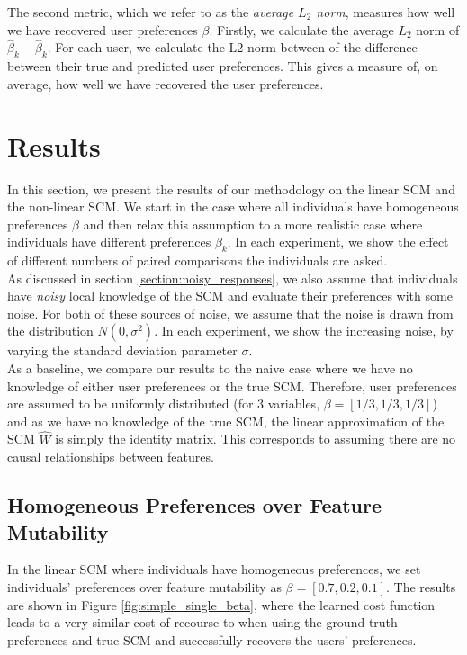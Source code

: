 \bigskip

The second metric, which we refer to as the \textit{average $L_2$ norm}, measures how well we have recovered user preferences $\beta$. Firstly, we calculate the average $L_2$ norm of $\hat{\beta}_k - \hat{\beta}_k$. For each user, we calculate the L2 norm between of the difference between their true and predicted user preferences. This gives a measure of, on average, how well we have recovered the user preferences. \\

\section{Results}

In this section, we present the results of our methodology on the linear SCM and the non-linear SCM. We start in the case where all individuals have homogeneous preferences $\beta$ and then relax this assumption to a more realistic case where individuals have different preferences $\beta_k$. In each experiment, we show the effect of different numbers of paired comparisons the individuals are asked. \\

As discussed in section \ref{section:noisy_responses}, we also assume that individuals have \textit{noisy} local knowledge of the SCM and evaluate their preferences with some noise. For both of these sources of noise, we assume that the noise is drawn from the distribution $N(0, \sigma^2)$. In each experiment, we show the increasing noise, by varying the standard deviation parameter $\sigma$. \\

As a baseline, we compare our results to the naive case where we have no knowledge of either user preferences or the true SCM. Therefore, user preferences are assumed to be uniformly distributed (for 3 variables, $\beta = [1/3, 1/3, 1/3]$) and as we have no knowledge of the true SCM, the linear approximation of the SCM $\hat{W}$ is simply the identity matrix. This corresponds to assuming there are no causal relationships between features.

\subsection{Homogeneous Preferences over Feature Mutability}

In the linear SCM where individuals have homogeneous preferences, we set individuals' preferences over feature mutability as $\beta = [0.7, 0.2, 0.1]$. The results are shown in Figure \ref{fig:simple_single_beta}, where the learned cost function leads to a very similar cost of recourse to when using the ground truth preferences and true SCM and successfully recovers the users' preferences.


